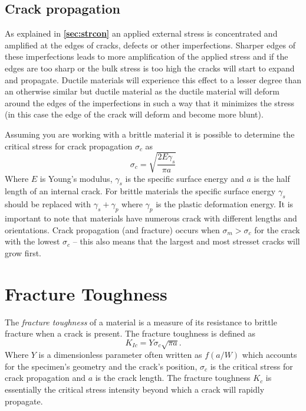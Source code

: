 \subsection{Crack propagation}
As explained in \textbf{\autoref{sec:strcon}} an applied external stress is concentrated and amplified at the edges of cracks, defects or other imperfections. Sharper edges of these imperfections leads to more amplification of the applied stress and if the edges are too sharp or the bulk stress is too high the cracks will start to expand and propagate. Ductile materials will experience this effect to a lesser degree than an otherwise similar but ductile material as the ductile material will deform around the edges of the imperfections in such a way that it minimizes the stress (in this case the edge of the crack will deform and become more blunt).

Assuming you are working with a brittle material it is possible to determine the critical stress for crack propagation $\sigma_c$ as
\[
  \sigma_c = \sqrt{\frac{2E \gamma_s}{\pi a}}
\]
Where $E$ is Young's modulus, $\gamma_s$ is the specific surface energy and $a$ is the half length of an internal crack. For brittle materials the specific surface energy $\gamma_s$ should be replaced with $\gamma_s + \gamma_p$ where $\gamma_p$ is the plastic deformation energy. It is important to note that materials have numerous crack with different lengths and orientations. Crack propagation (and fracture) occurs when $\sigma_m > \sigma_c$ for the crack with the lowest $\sigma_c$ -- this also means that the largest and most stresset cracks will grow first.


\section{Fracture Toughness}
The \textit{fracture toughness} of a material is a measure of its resistance to brittle fracture when a crack is present. The fracture toughness is defined as
\[ 
K_{Ic} = Y \sigma_c \sqrt{\pi a}
.\]
Where $Y$ is a dimensionless parameter often written as $f(a / W)$ which accounts for the specimen's geometry and the crack's position, $\sigma_c$ is the critical stress for crack propagation and $a$ is the crack length.  The fracture toughness $K_c$ is essentially the critical stress intensity beyond which a crack will rapidly propagate. 

